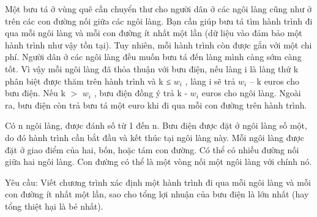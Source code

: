 Một bưu tá ở vùng quê cần chuyển thư cho người dân ở các ngôi làng cũng như ở trên các con đường nối giữa các ngôi làng. Bạn cần giúp bưu tá tìm hành trình đi qua mỗi ngôi làng và mỗi con đường ít   nhất một lần (dữ liệu vào đảm bảo một hành trình như vậy tồn tại). Tuy nhiên, mỗi hành trình còn được gắn với một chi phí. Người dân ở các ngôi làng đều muốn bưu tá đến làng mình càng sớm càng tốt. Vì vậy   mỗi ngôi làng đã thỏa thuận với bưu điện, nếu làng i là làng thứ k phân biệt được thăm trên hành trình và k ≤ $w_{i}$   , làng i sẽ trả $w_{i}$   – k euros cho bưu điện. Nếu k $>$ $w_{i}$   ,   bưu điện đồng ý trả k - $w_{i}$   euros cho ngôi làng. Ngoài ra, bưu điện còn trả bưu tá một euro khi đi qua mỗi con đường trên hành trình.  

   Có n ngôi làng, được đánh số từ 1 đến n. Bưu điện được đặt ở ngôi làng số một, do đó hành trình cần bắt đầu và kết thúc tại ngôi làng này. Mỗi ngôi làng được đặt ở giao điểm của hai, bốn, hoặc tám con   đường. Có thể có nhiều đường nối giữa hai ngôi làng. Con đường có thể là một vòng nối một ngôi làng với chính nó.  

   Yêu cầu: Viết chương trình xác định một hành trình đi qua mỗi ngôi làng và mỗi con đường ít nhất một lần, sao cho tổng lợi nhuận của bưu điện là lớn nhất (hay tổng thiệt hại là bé nhất).